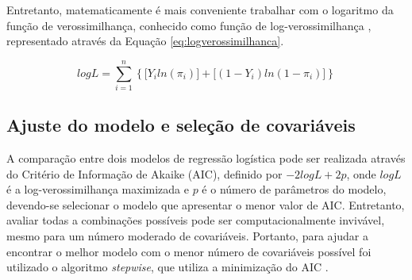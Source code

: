 \documentclass[twocolumn]{rbef}
\newcommand{\1}{\mathbbm{1}}
\begin{document}
Entretanto, matematicamente é mais conveniente trabalhar com o logaritmo da função de verossimilhança, conhecido como função de log-verossimilhança \cite{Favero2017,Botelho2010}, representado através da Equação \eqref{eq:logverossimilhanca}.

\begin{equation}
logL = \sum_{i=1}^{n} \left\{ \big[Y_iln(\pi_i)\big] + \big[(1-Y_i)ln(1-\pi_i)\big] \right\}\label{eq:logverossimilhanca}
\end{equation}

\hypertarget{ajuste-do-modelo-e-seleuxe7uxe3o-de-covariuxe1veis}{%
\subsection{Ajuste do modelo e seleção de covariáveis}\label{ajuste-do-modelo-e-seleuxe7uxe3o-de-covariuxe1veis}}

A comparação entre dois modelos de regressão logística pode ser realizada através do Critério de Informação de Akaike (AIC), definido por \(-2logL + 2p\), onde \(logL\) é a log-verossimilhança maximizada e \(p\) é o número de parâmetros do modelo, devendo-se selecionar o modelo que apresentar o menor valor de AIC. Entretanto, avaliar todas a combinações possíveis pode ser computacionalmente invivável, mesmo para um número moderado de covariáveis. Portanto, para ajudar a encontrar o melhor modelo com o menor número de covariáveis possível foi utilizado o algoritmo \textit{stepwise}, que utiliza a minimização do AIC \cite{Taconeli2019}.
\end{document}
